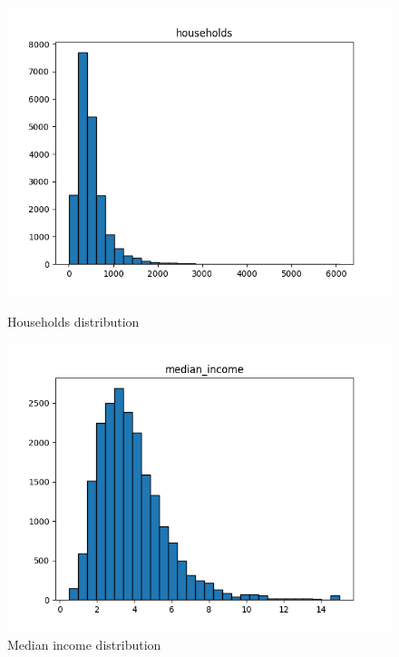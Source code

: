 \documentclass[a4paper, 11pt]{article}
\begin{document}
\begin{figure}[htbp]
    \centering
    \vspace{0.1cm}  %
    
    \begin{minipage}{0.45\textwidth}
        \centering
        \includegraphics[width=\linewidth]{figs/households_distribution.png}
        \caption{Households distribution}
        \label{fig:households_distribution}
    \end{minipage}\hfill
    \begin{minipage}{0.45\textwidth}
        \centering
        \includegraphics[width=\linewidth]{figs/median_income_distribution.png}
        \caption{Median income distribution}
        \label{fig:median_income_distribution}
    \end{minipage}
    

\end{figure}
\end{document}
